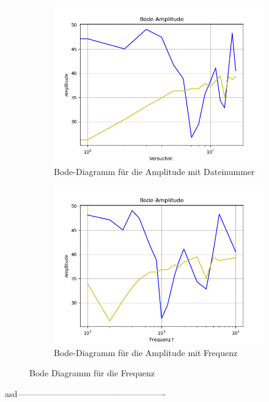 \documentclass[12pt, oneside, a4paper, \docLanguage]{report}
\begin{document}
\begin{figure}[H]
\centering
\begin{subfigure}{.5\textwidth}
  \centering
  \includegraphics[width=0.9\linewidth]{../data/img/bodeamplitudeanzahl.png}
  \caption{Bode-Diagramm für die Amplitude mit Dateinummer}
  \label{fig:Bode-Diagramm für die Amplitude mit Dateinummer}
\end{subfigure}%
\begin{subfigure}{.5\textwidth}
  \centering
  \includegraphics[width=0.9\linewidth]{../data/img/bodeamplitudefrequenz.png}
  \caption{Bode-Diagramm für die Amplitude mit Frequenz}
  \label{fig:Bode-Diagramm für die Amplitude mit Frequenz}
\end{subfigure}
\caption{Bode Diagramm für die Frequenz}
\label{fig:Bode Diagramm für die Frequenz}
\end{figure}
asd----------------------------------------------------
\end{document}
